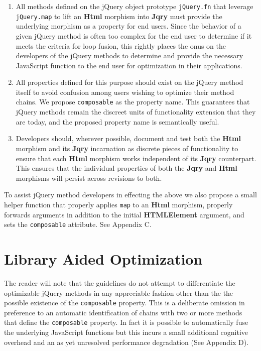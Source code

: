 \documentclass[preprint]{sigplanconf}
\begin{document}
\begin{enumerate}
  \item \label{item:standard-1} All methods defined on the jQuery object prototype \verb|jQuery.fn| that leverage \verb|jQuery.map| to lift an \textbf{Html} morphism into \textbf{Jqry} must provide the underlying morphism as a property for end users. Since the behavior of a given jQuery method is often too complex for the end user to determine if it meets the criteria for loop fusion, this rightly places the onus on the developers of the jQuery methods to determine and provide the necessary JavaScript function to the end user for optimization in their applications.
  \item \label{item:standard-2} All properties defined for this purpose should exist on the jQuery method itself to avoid confusion among users wishing to optimize their method chains. We propose \verb|composable| as the property name. This guarantees that jQuery methods remain the discreet units of functionality extension that they are today, and the proposed property name is semantically useful.
  \item \label{item:standard-3}Developers should, wherever possible, document and test both the \textbf{Html} morphism and its \textbf{Jqry} incarnation as discrete pieces of functionality to ensure that each \textbf{Html} morphism works independent of its \textbf{Jqry} counterpart. This ensures that the individual properties of both the \textbf{Jqry} and \textbf{Html} morphisms will persist across revisions to both.
\end{enumerate}

To assist jQuery method developers in effecting the above we also propose a small helper function that properly applies \verb|map| to an \textbf{Html} morphism, properly forwards arguments in addition to the initial \textbf{HTMLElement} argument, and sets the \verb|composable| attribute. See Appendix C.

\section{Library Aided Optimization} \label{sec:library-aided-optimization}

The reader will note that the guidelines do not attempt to differentiate the optimizable jQuery methods in any appreciable fashion other than the the possible existence of the \verb|composable| property. This is a deliberate omission in preference to an automatic identification of chains with two or more methods that define the \verb|composable| property. In fact it is possible to automatically fuse the underlying JavaScript functions but this incurs a small additional cognitive overhead and an as yet unresolved performance degradation (See Appendix D).
\\
\end{document}
